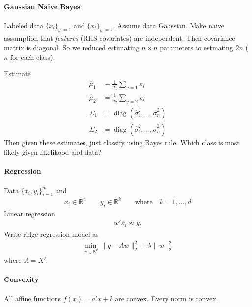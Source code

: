 \documentclass[12pt]{book}
\numberwithin{equation}{section} %
\theoremstyle{plain}
\theoremstyle{definition}
\theoremstyle{remark}
\newcommand{\diag}{\operatorname{diag}}
\newcommand{\R}{\mathbb{R}}
\newcommand{\Rn}{\mathbb{R}^n}
\newcommand{\Rk}{\mathbb{R}^k}
\begin{document}
\paragraph{Gaussian Naive Bayes}
Labeled data $\{x_i\}_{y_i=1}$ and $\{x_i\}_{y_i=2}$.
Assume data Gaussian.
Make naive assumption that \emph{features} (RHS covariates) are
independent.
Then covariance matrix is diagonal. So we reduced estimating $n\times n$
parameters to estmating $2n$ ($n$ for each class).

Estimate
\begin{align*}
  \hat{\mu}_1 &= \frac{1}{n_1}\sum_{y=1}x_i
  \\
  \hat{\mu}_2 &= \frac{1}{n_2}\sum_{y=2}x_i
  \\
  \hat{\Sigma}_1 &= \diag(\hat{\sigma}_1^2,\ldots,\hat{\sigma}_n^2)
  \\
  \hat{\Sigma}_2 &= \diag(\hat{\sigma}_1^2,\ldots,\hat{\sigma}_n^2)
\end{align*}
Then given these estimates, just classify using Bayes rule.
Which class is most likely given likelihood and data?


\paragraph{Regression}
Data $\{x_i,y_i\}_{i=1}^m$ and
\begin{align*}
  x_i\in\Rn
  \qquad
  y_i\in \R^k
  \qquad\text{where}\quad
  k=1,\ldots,d
\end{align*}
Linear regression
\begin{align*}
  w'x_i \approx y_i
\end{align*}
Write ridge regression model as
\begin{align*}
  \min_{w\in\Rk}
  \lVert y-A w\rVert_2^2
  + \lambda \lVert w\rVert_2^2
\end{align*}
where $A=X'$.


\paragraph{Convexity}
All affine functions $f(x)=a'x+b$ are convex.
Every norm is convex.
\end{document}
